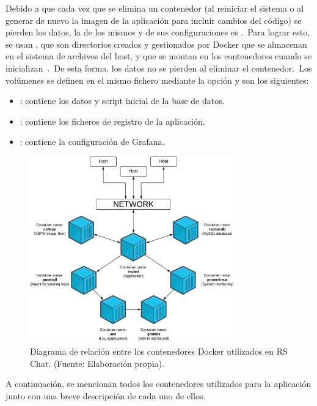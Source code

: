 Debido a que cada vez que se elimina un contenedor (al reiniciar el sistema o al generar de nuevo la imagen de la
aplicación para incluir cambios del código) se pierden los datos, la  de los mismos y de sus
configuraciones es .\ Para lograr esto, se usan , que son directorios creados y
gestionados por Docker que se almacenan en el sistema de archivos del host, y que se montan en los contenedores cuando
se inicializan~\cite{docker-volumes}.\ De esta forma, los datos no se pierden al eliminar el contenedor.\ Los
volúmenes se definen en el mismo fichero  mediante la opción  y son
los siguientes:

\begin{itemize}
	\item {}: contiene los datos y script inicial de la base de datos.
	\item {}: contiene los ficheros de registro de la aplicación.
	\item {}: contiene la configuración de Grafana.
\end{itemize}

\begin{figure}[ht]
	\centering
	\includegraphics[width=0.8\textwidth]{res/images/InfraestructuraDockerRSChat}
	\caption{Diagrama de relación entre los contenedores Docker utilizados en RS Chat. (Fuente: Elaboración propia).}
	\label{fig:docker-container-diagram}
\end{figure}

A continuación, se mencionan todos los contenedores utilizados para la aplicación junto con una breve descripción de
cada uno de ellos.

